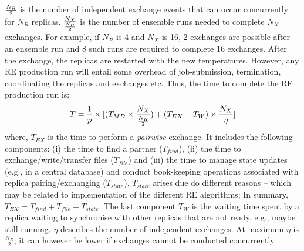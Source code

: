 \documentclass{rspublic}
\newcommand{\alnote}[1]{ {\textcolor{blue} { ***andre: #1 }}}
\newcommand{\athotanote}[1]{ {\textcolor{green} { ***athota: #1 }}}
\newcommand{\alnote}[1]{}
\newcommand{\athotanote}[1]{}
\begin{document}
$N_R \over 2$ is the number of independent exchange events that can
occur concurrently for $N_R$ replicas. $N_X \over {N_R \over 2}$ is
the number of ensemble runs needed to complete $N_X$ exchanges.
For example, if $N_R$ is 4 and $N_X$ is 16, 2 exchanges are possible
after an ensemble run and 8 such runs are required to complete 16
exchanges.  After the exchange, the replicas are restarted with the
new temperatures.
However, any RE production run will
entail some overhead  of job-submission, termination, coordinating the replicas and exchanges
etc. Thus, the time to complete the RE production run is:
\begin{eqnarray}
  T = {1\over p} \times [(T_{MD} \times  {N_X \over {N_R \over 2} }) +
  {(T_{EX} + T_{W})} \times {N_X \over \eta}]
\label{eq:totaltime}
\end{eqnarray}
where, $T_{EX}$ is the time to perform a {\it pairwise} exchange. It
includes the following components: (i) the time to find a partner
($T_{find}$), (ii) the time to exchange/write/transfer files
($T_{file}$) and (iii) the time to manage state updates (e.g., in a
central database) and conduct book-keeping operations associated with
replica pairing/exchanging ($T_{state}$). $T_{state}$ arises due do
different reasons -- which may be related to
implementation %
of the different RE algorithms; In summary, $T_{EX} = T_{find} +
T_{file}+T_{state}$.  The last component $T_W$ is the waiting time
spent by a replica waiting to synchronise with other replicas that are
not ready, e.g., maybe still running. $\eta$ describes the number of 
independent exchanges. At maximum $\eta$ is $\frac{N_R}{2}$; it can however
be lower if exchanges cannot be conducted concurrently.
\end{document}
